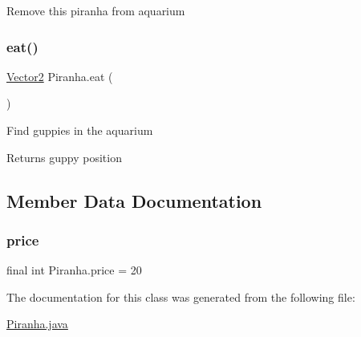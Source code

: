 Remove this piranha from aquarium \mbox{\label{class_piranha_a2d47b544cd3f2dfd6321fdceeb16fbc8}} 
\subsubsection{\texorpdfstring{eat()}{eat()}}
{\footnotesize\ttfamily \mbox{\hyperlink{class_vector2}{Vector2}} Piranha.\+eat (\begin{DoxyParamCaption}{ }\end{DoxyParamCaption})\hspace{0.3cm}{\ttfamily [inline]}}

Find guppies in the aquarium \begin{DoxyReturn}{Returns}
guppy position 
\end{DoxyReturn}


\subsection{Member Data Documentation}
\mbox{\label{class_piranha_a4df74b901061840159a8b8e0d5e14f88}} 
\subsubsection{\texorpdfstring{price}{price}}
{\footnotesize\ttfamily final int Piranha.\+price = 20\hspace{0.3cm}{\ttfamily [static]}}



The documentation for this class was generated from the following file\+:\begin{DoxyCompactItemize}
\item 
\mbox{\hyperlink{_piranha_8java}{Piranha.\+java}}\end{DoxyCompactItemize}
